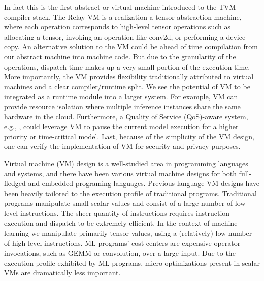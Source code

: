 In fact this is the first abstract or virtual machine introduced to the
  TVM compiler stack.
The Relay VM is a realization a tensor abstraction machine,
  where each operation corresponds to high-level tensor operations such
  as allocating a tensor, invoking an operation like conv2d, or performing a device copy.
An alternative solution to the VM could be ahead of time
  compilation from our abstract machine into machine code.
But due to the granularity of the operations, dispatch time makes
  up a very small portion of the execution time.
More importantly, the VM provides flexibility traditionally attributed
  to virtual machines and a clear compiler/runtime split.
We see the potential of VM to be integrated as a runtime module into a larger system.
For example, VM can provide resource isolation where multiple inference
  instances share the same hardware in the cloud.
Furthermore, a Quality of Service (QoS)-aware system, e.g., \citep{kang2018hotmobile, Yachir2009rsj},
  could leverage VM to pause the current model execution for a higher priority or time-critical model.
Last, because of the simplicity of the VM design, one can verify the implementation of VM for security and privacy purposes.


Virtual machine (VM) design is a well-studied area in programming languages and systems,
  and there have been various virtual machine designs for both full-fledged and embedded programing languages.
Previous language VM designs have been heavily tailored to the execution profile of traditional programs.
Traditional programs manipulate small scalar values
  and consist of a large number of low-level instructions.
The sheer quantity of instructions requires instruction execution
  and dispatch to be extremely efficient.
In the context of machine learning we manipulate primarily tensor values,
  using a (relatively) low number of high level instructions.
ML programs’ cost centers are expensive operator invocations,
  such as GEMM or convolution, over a large input.
Due to the execution profile exhibited by ML programs,
  micro-optimizations present in scalar VMs are dramatically less important.



